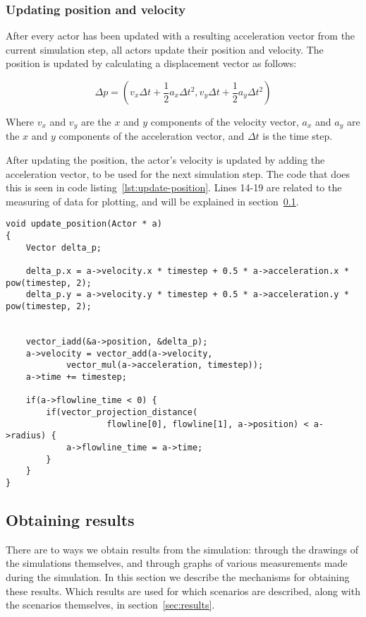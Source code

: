 \subsubsection{Updating position and velocity}
After every actor has been updated with a resulting acceleration vector from 
the current simulation step, all actors update their position and velocity.  
The position is updated by calculating a displacement vector as follows:

\begin{equation}
    \Delta p = (v_x \Delta t + \frac{1}{2}a_x \Delta t^2, v_y \Delta t + 
    \frac{1}{2}a_y \Delta t^2)
\end{equation}

Where $v_x$ and $v_y$ are the $x$ and $y$ components of the velocity vector, 
$a_x$ and $a_y$ are the $x$ and $y$ components of the acceleration vector, and 
$\Delta t$ is the time step.

After updating the position, the actor's velocity is updated by adding the 
acceleration vector, to be used for the next simulation step. The code that 
does this is seen in code listing~\ref{lst:update-position}. Lines 14-19 are 
related to the measuring of data for plotting, and will be explained in 
section~\ref{sec:measurement}.

\begin{lstlisting}[caption={Code updating the actor 
    position.},label=lst:update-position]
void update_position(Actor * a)
{
    Vector delta_p;

    delta_p.x = a->velocity.x * timestep + 0.5 * a->acceleration.x * pow(timestep, 2);
    delta_p.y = a->velocity.y * timestep + 0.5 * a->acceleration.y * pow(timestep, 2);


    vector_iadd(&a->position, &delta_p);
	a->velocity = vector_add(a->velocity,
			vector_mul(a->acceleration, timestep));
    a->time += timestep;

	if(a->flowline_time < 0) {
        if(vector_projection_distance(
					flowline[0], flowline[1], a->position) < a->radius) {
			a->flowline_time = a->time;
		}
	}
}
\end{lstlisting}

\subsection{Obtaining results}
\label{sec:measurement}
There are to ways we obtain results from the simulation: through the drawings 
of the simulations themselves, and through graphs of various measurements made 
during the simulation. In this section we describe the mechanisms for 
obtaining these results. Which results are used for which scenarios are 
described, along with the scenarios themselves, in section~\ref{sec:results}.

